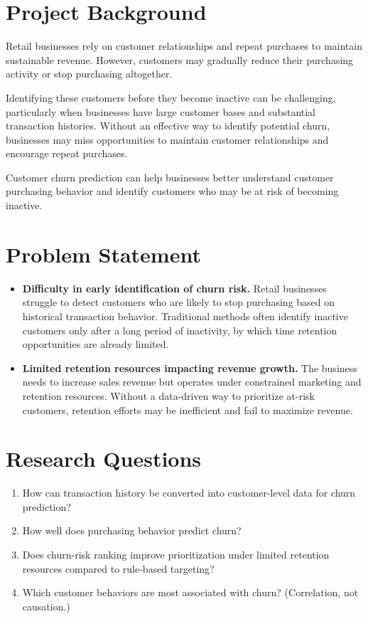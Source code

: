 \section{Project Background}
\label{sec:1-1}

Retail businesses rely on customer relationships and repeat purchases to maintain sustainable revenue. However, customers may gradually reduce their purchasing activity or stop purchasing altogether.

Identifying these customers before they become inactive can be challenging, particularly when businesses have large customer bases and substantial transaction histories. Without an effective way to identify potential churn, businesses may miss opportunities to maintain customer relationships and encourage repeat purchases.

Customer churn prediction can help businesses better understand customer purchasing behavior and identify customers who may be at risk of becoming inactive.

\section{Problem Statement}
\label{sec:1-2}

\begin{itemize}
    \item \textbf{Difficulty in early identification of churn risk.} Retail businesses struggle to detect customers who are likely to stop purchasing based on historical transaction behavior. Traditional methods often identify inactive customers only after a long period of inactivity, by which time retention opportunities are already limited.
    \item \textbf{Limited retention resources impacting revenue growth.} The business needs to increase sales revenue but operates under constrained marketing and retention resources. Without a data-driven way to prioritize at-risk customers, retention efforts may be inefficient and fail to maximize revenue.
\end{itemize}

\section{Research Questions}
\label{sec:1-3}

\begin{enumerate}
    \item How can transaction history be converted into customer-level data for churn prediction?
    \item How well does purchasing behavior predict churn?
    \item Does churn-risk ranking improve prioritization under limited retention resources compared to rule-based targeting?
    \item Which customer behaviors are most associated with churn? (Correlation, not causation.)
\end{enumerate}

